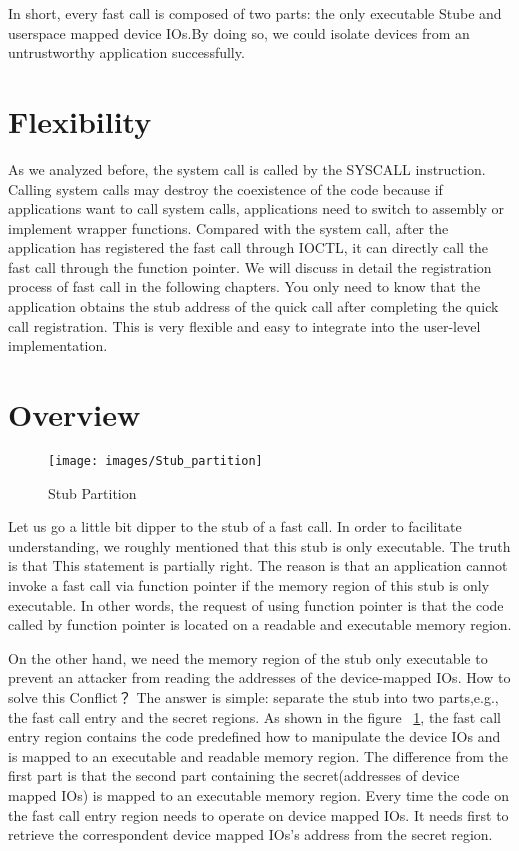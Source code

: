 In short, every fast call is composed of two parts: the only executable Stube and userspace mapped device IOs.By doing so, we could isolate devices from an untrustworthy application successfully. 

\section{Flexibility}

As we analyzed before, the system call is called by the SYSCALL instruction. Calling system calls may destroy the coexistence of the code because if applications want to call system calls, applications need to switch to assembly or implement wrapper functions. Compared with the system call, after the application has registered the fast call through IOCTL, it can directly call the fast call through the function pointer. We will discuss in detail the registration process of fast call in the following chapters. You only need to know that the application obtains the stub address of the quick call after completing the quick call registration. This is very flexible and easy to integrate into the user-level implementation.

\section{Overview}
\begin{figure}[tbp]
  \centering
  \texttt{[image: images/Stub\_partition]}
  \caption[Short description]{Stub Partition}
  \label{fig:Stub_partition}
\end{figure}

Let us go a little bit dipper to the stub of a fast call. 
In order to facilitate understanding, we roughly mentioned 
that this stub is only executable. The truth is that This statement is partially right. 
The reason is that an application cannot invoke a fast call via function pointer if the memory 
region of this stub is only executable. In other words, the request of using function pointer 
is that the code called by function pointer is located on a readable and executable memory region.

On the other hand, we need the memory region of the stub only 
executable to prevent an attacker from reading the addresses of 
the device-mapped IOs. How to solve this Conflict？ The answer is 
simple: separate the stub into two parts,e.g., the fast call entry and the secret regions. 
As shown in the figure  ~\ref{fig:Stub_partition}, the fast call entry region contains the code predefined how to manipulate the device IOs and is mapped to an executable and readable memory region. The difference from the first part is that the second part containing the secret(addresses of device mapped IOs) is mapped to an executable memory region. Every time the code on the fast call entry region needs to operate on device mapped IOs. It needs first to retrieve the correspondent device mapped IOs's address from the secret region. 

